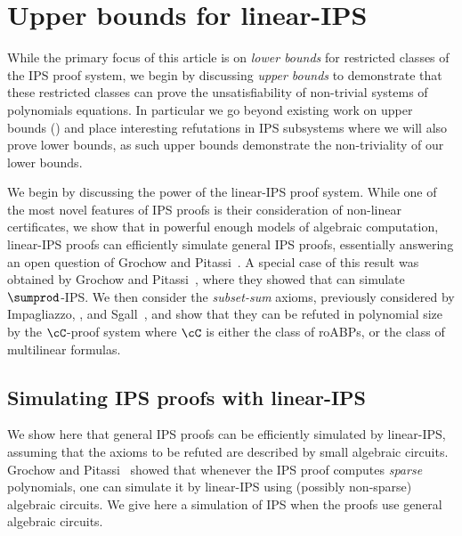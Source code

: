 \documentclass[11pt]{article}
\numberwithin{equation}{section}
\theoremstyle{definition}
\theoremstyle{plain}
\begin{document}
%
%
%
%

\section{Upper bounds for linear-IPS}\label{sec:h-ips:ubs}

While the primary focus of this %
article   %
is on \emph{lower bounds} for restricted classes of the IPS proof system, we begin by discussing \emph{upper bounds} to demonstrate that these restricted classes can prove the unsatisfiability of non-trivial systems of polynomials equations. In particular we go beyond existing work on upper bounds (\cite{GrigorievHirsch03,RazTzameret08a,RazTzameret08b,DBLP:journals/jacm/GrochowP18,LiTW15}) and place interesting refutations in IPS subsystems where we will also prove lower bounds, as such upper bounds demonstrate the non-triviality of our lower bounds.

We begin by discussing the power of the linear-IPS proof system. While one of the most novel features of IPS proofs is their consideration of non-linear certificates, we show that in powerful enough models of algebraic computation, linear-IPS proofs can efficiently simulate general IPS proofs, essentially answering an open question of Grochow and Pitassi~\cite{DBLP:journals/jacm/GrochowP18}. A special case of this result was obtained by Grochow and Pitassi~\cite{DBLP:journals/jacm/GrochowP18}, where they showed that \lIPS can simulate $\sumprod$-IPS\@.  We then consider the \emph{subset-sum} axioms, previously considered by Impagliazzo, \Pudlak, and Sgall~\cite{IPS99}, and show that they can be refuted in polynomial size by the $\cC$-\lIPS proof system where $\cC$ is either the class of roABPs, or the class of multilinear formulas.

\subsection{Simulating IPS proofs with linear-IPS}\label{sec:h-ips:ips=h-ips}

We show here that general IPS proofs can be efficiently simulated by linear-IPS, assuming that the axioms to be refuted are described by small algebraic circuits.  Grochow and Pitassi~\cite{DBLP:journals/jacm/GrochowP18} showed that whenever the IPS proof computes \emph{sparse} polynomials, one can simulate it by linear-IPS using (possibly non-sparse) algebraic circuits.  We give here a simulation of IPS when the proofs use general algebraic circuits.
\end{document}
